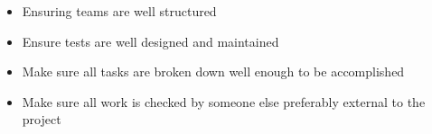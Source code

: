 \documentclass{article}
\begin{document}
\begin{itemize}

    \item{Ensuring teams are well structured}

    \item{Ensure tests are well designed and maintained}

    \item{Make sure all tasks are broken down well enough to be accomplished}
    
    \item{Make sure all work is checked by someone else preferably external to the project}

\end{itemize}
\end{document}
